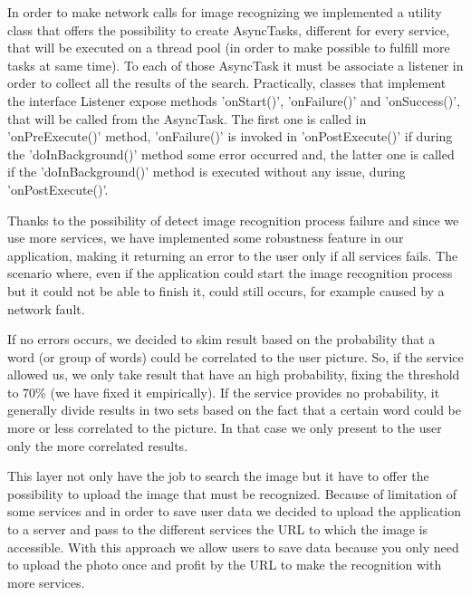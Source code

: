 %		

In order to make network calls for image recognizing we implemented a utility 
class that offers the possibility to create AsyncTasks, different for every 
service, that will be executed on a thread pool (in order to make possible to 
fulfill more tasks at same time). To each of those AsyncTask it must be associate 
a listener in order to collect all the results of the search. Practically, 
classes that implement the interface Listener expose methods 'onStart()', 
'onFailure()' and 'onSuccess()', that will be called from the AsyncTask. The 
first one is called in 'onPreExecute()' method, 'onFailure()' is invoked in 
'onPostExecute()' if during the 'doInBackground()' method some error occurred 
and, the latter one is called if the 'doInBackground()' method is executed 
without any issue, during 'onPostExecute()'.

Thanks to the possibility of detect image recognition process failure and since 
we use more services, we have implemented some robustness feature in our 
application, making it returning an error to the user only if all services fails. 
The scenario where, even if the application could start the image recognition 
process but it could not be able to finish it, could still occurs, for example 
caused by a network fault.

If no errors occurs, we decided to skim result based on the probability that a 
word (or group of words) could be correlated to the user picture. So, if the 
service allowed us, we only take result that have an high probability, fixing the 
threshold to 70\% (we have fixed it empirically). If the service provides no 
probability, it generally divide results in two sets based on the fact that a 
certain word could be more or less correlated to the picture. In that case we 
only present to the user only the more correlated results.

This layer not only have the job to search the image but it have to offer the 
possibility to upload the image that must be recognized. Because of limitation 
of some services and in order to save user data we decided to upload the 
application to a server and pass to the different services the URL to which the 
image is accessible. With this approach we allow users to save data because you 
only need to upload the photo once and profit by the URL to make the recognition 
with more services. 